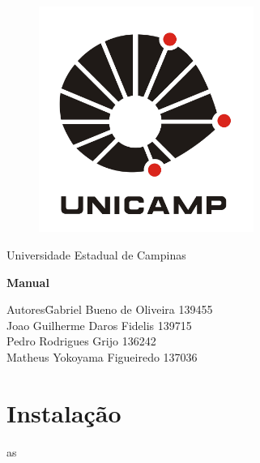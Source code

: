 \documentclass[a4paper,10pt]{article}
\date{\today}
\begin{document}
	\begin{titlepage}
		\begin{figure}
			\centering
			\includegraphics[width=7cm,keepaspectratio=true]{imagens/unicamp.png}
	
		\end{figure}
		\begin{center}
			\huge{Universidade Estadual de Campinas}
		
		\vfill
		\textbf{\LARGE{Manual}}
		\vfill
		\end{center}
		
		\begin{flushleft}
			\begin{tabbing}
				Autores\qquad\qquad\= Gabriel Bueno de Oliveira 139455 \\
					\>Joao Guilherme Daros Fidelis 139715 \\
					\>Pedro Rodrigues Grijo 136242\\
					\>Matheus Yokoyama Figueiredo 137036\\
			\end{tabbing}
		\end{flushleft}
	\end{titlepage}

\newpage
\section{Instalação}
as
\end{document}
